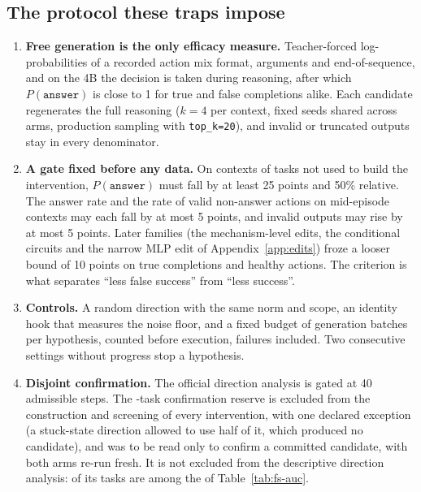 \subsection{The protocol these traps impose}
\label{sec:protocol}
\begin{enumerate}
\item \textbf{Free generation is the only efficacy measure.} Teacher-forced log-probabilities of a recorded action mix format, arguments and end-of-sequence, and on the 4B the decision is taken during reasoning, after which $P(\texttt{answer})$ is close to 1 for true and false completions alike. %
Each candidate regenerates the full reasoning ($k=4$ per context, fixed seeds shared across arms, production sampling with \texttt{top\_k=20}), and invalid or truncated outputs stay in every denominator.
\item \textbf{A gate fixed before any data.} On \fsp{} contexts of tasks not used to build the intervention, $P(\texttt{answer})$ must fall by at least 25 points and 50\% relative. The \fsm{} answer rate and the rate of valid non-answer actions on mid-episode contexts may each fall by at most 5 points, and invalid outputs may rise by at most 5 points. %
Later families (the mechanism-level edits, the conditional circuits and the narrow MLP edit of Appendix~\ref{app:edits}) froze a looser bound of 10 points on true completions and healthy actions. %
The \fsm{} criterion is what separates ``less false success'' from ``less success''.
\item \textbf{Controls.} A random direction with the same norm and scope, an identity hook that measures the noise floor, and a fixed budget of generation batches per hypothesis, counted before execution, failures included. Two consecutive settings without progress stop a hypothesis.
\item \textbf{Disjoint confirmation.} The official direction analysis is gated at 40 admissible \fsp{} steps. The \ofReserveN-task confirmation reserve is excluded from the construction and screening of every intervention, with one declared exception (a stuck-state direction allowed to use half of it, which produced no candidate), and was to be read only to confirm a committed candidate, with both arms re-run fresh. It is not excluded from the descriptive direction analysis: \ofReserveIn{} of its tasks are among the \ofTasks{} of Table~\ref{tab:fs-auc}. %
\end{enumerate}
